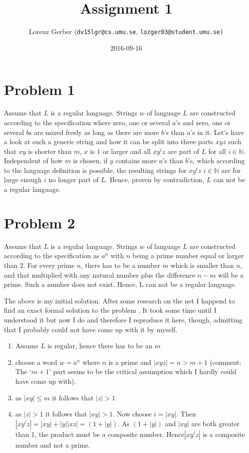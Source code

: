 \documentclass[a4paper,11pt,twoside]{article}
\title{Assignment 1}
\author{Lorenz Gerber ({\tt{dv15lgr@cs.umu.se}}, {\tt{lozger03@student.umu.se})}}
\date{2016-09-16}
\begin{document}
\lstset{language=C}
\maketitle
\thispagestyle{empty}
\newpage

\clearpage
{}

\section*{Problem 1} 
Assume that $L$ is a regular language. Strings $w$ of language $L$ are constructed according to the specification where zero, one or several $a$'s and zero, one or several $b$s are mixed freely as long as there are more $b$'s than $a$'s in it. Let's have a look at such a generic string and how it can be split into three parts $xyz$ such that $xy$ is shorter than $m$, $x$ is $1$ or larger and all $xy^{i}z$ are part of $L$ for all $i \in \mathbb{N}$. Independent of how $m$ is chosen, if $y$ contains more $a$'s than $b$'s, which according to the language definition is possible,  the resulting strings for $xy^{i}z$ $i \in \mathbb{N}$  are for large enough $i$ no longer part of $L$. Hence, proven by contradiction, $L$ can not be a regular language. 

\section*{Problem 2}
Assume that $L$ is a regular language. Strings $w$ of language $L$ are constructed according to the specification as $a^n$ with $n$ being a prime number equal or larger than $2$. For every prime $n$, there has to be a number $m$ which is smaller than $n$, and that multiplied with any natural number plus the difference $n - m$ will be a prime. Such a number does not exist. Hence, L can not be a regular language. 

The above is my initial solution. After some research on the net I
happend to find an exact formal solution to the problem \cite{pumpprime}. It took some
time until I understood it but now I do and therefore I reproduce it
here, though,  admitting that I probably could not have come up with it by
myself. 
 
\begin{enumerate}
\item Assume $L$ is regular, hence there has to be an $m$
\item choose a word $w=a^{n}$ where $n$ is a prime and $|xyz| = n >
  m+1$ (comment: The `$m+1$' part seems to be the critical assumption which I hardly could have come up with).
\item as $|xy| \leqslant m$ it follows that $|z| > 1$
\item as $|z| > 1$ it follows that $|xy| > 1$. Now choose $i =
  |xy|$. Then $|xy^{i}z| = |xy|+|y||xz|=(1+|y|)$. As $(1+|y|)$  and
  $|xy|$ are both greater than 1, the product must be a composite
  number. Hence$|xy^{i}z|$ is a composite number and not a prime.
\end{enumerate}
\end{document}

